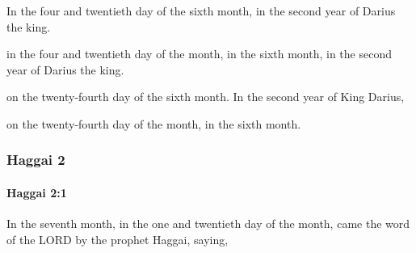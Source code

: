 			In the four and twentieth day of the sixth month, in the second year of Darius the king.

			\begin{versebox}
					\item[BHS] 
					\item[LXX] 
					\item[ASV] in the four and twentieth day of the month, in the sixth month, in the second year of Darius the king.
					\item[NIV] on the twenty-fourth day of the sixth month. In the second year of King Darius,
					\item[NRSV] on the twenty-fourth day of the month, in the sixth month.
			\end{versebox}
	\subsubsection{Haggai 2} %
		\label{HAGGAI-2}

		\paragraph{Haggai 2:1} %
			\label{HAGGAI-2-1}

			In the seventh month, in the one and twentieth day of the month, came the word of the LORD by the prophet Haggai, saying,

